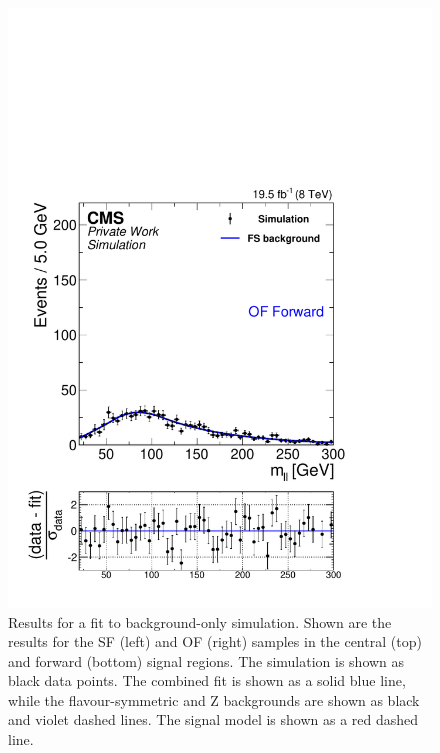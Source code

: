 \begin{figure}[hbp]
\begin{minipage}[t]{0.49\textwidth}
    \includegraphics[width=\textwidth]{plots/results/fit/mcFits/fit2012OFOS_ETHTriangle_SignalInclusive_Combined_Full2012_ETHTriangle_MC_Forward.pdf}
  \end{minipage}
  \caption{Results for a fit to background-only simulation. Shown are the results for the SF (left) and OF (right) samples in the central (top) and forward (bottom) signal regions. The simulation is shown as black data points. The combined fit is shown as a solid blue line, while the flavour-symmetric and Z backgrounds are shown as black and violet dashed lines. The signal model is shown as a red dashed line. }
  \label{fig:mc:bgOnly}
\end{figure}

